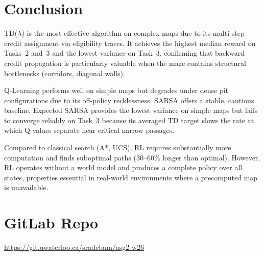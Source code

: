 \documentclass[11pt,letterpaper]{article}
\begin{document}
\section{Conclusion}

TD($\lambda$) is the most effective algorithm on complex maps due to its multi-step
credit assignment via eligibility traces. It achieves the highest median reward on
Tasks~2 and~3 and the lowest variance on Task~3, confirming that backward credit
propagation is particularly valuable when the maze contains structural bottlenecks
(corridors, diagonal walls).

Q-Learning performs well on simple maps but degrades under dense pit configurations
due to its off-policy recklessness. SARSA offers a stable, cautious baseline.
Expected SARSA provides the lowest variance on simple maps but fails to converge
reliably on Task~3 because its averaged TD target slows the rate at which Q-values
separate near critical narrow passages.

Compared to classical search (A*, UCS), RL requires substantially more computation
and finds suboptimal paths (30--60\% longer than optimal). However, RL operates
without a world model and produces a complete policy over all states, properties
essential in real-world environments where a precomputed map is unavailable.

\section{GitLab Repo}

\url{https://git.uwaterloo.ca/sradebam/asg2-w26}
\end{document}
